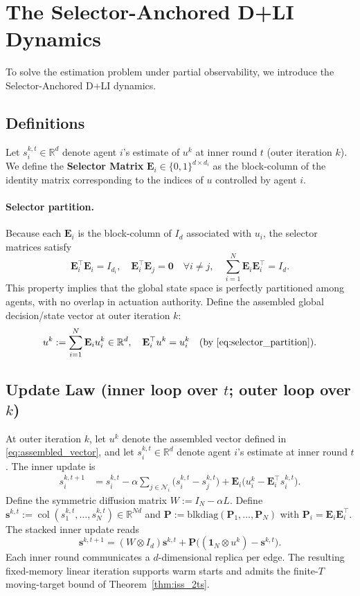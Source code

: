\documentclass[letterpaper, 10 pt, conference]{ieeeconf} %
\DeclareMathOperator{\col}{col}
\begin{document}
\section{The Selector-Anchored D+LI Dynamics}
\label{sec:Selector-Anchored}
To solve the estimation problem under partial observability, we introduce the Selector-Anchored D+LI dynamics. 
\subsection{Definitions}
Let $s_i^{k,t}\in\mathbb{R}^d$ denote agent $i$'s estimate of $u^k$ at inner round $t$ (outer iteration $k$). We define the \textbf{Selector Matrix} $\mathbf{E}_i \in \{0,1\}^{d \times d_i}$ as the block-column of the identity matrix corresponding to the indices of $u$ controlled by agent $i$.
\paragraph{Selector partition.}
Because each \(\mathbf E_i\) is the block-column of \(I_d\) associated with \(u_i\), the selector matrices satisfy
\begin{equation}\label{eq:selector_partition}
\mathbf{E}_i^\top \mathbf{E}_i = I_{d_i},
\quad
\mathbf{E}_i^\top \mathbf{E}_j = \mathbf{0}\quad \forall i\neq j,
\quad
\sum_{i=1}^N \mathbf{E}_i \mathbf{E}_i^\top = I_d.
\end{equation}
This property implies that the global state space is perfectly partitioned among agents, with no overlap in actuation authority. Define the assembled global decision/state vector at outer iteration $k$:
\begin{align}\label{eq:assembled_vector}
u^k
:=\sum_{i=1}^N\mathbf E_i u_i^k\in\mathbb R^d,
\quad \mathbf E_i^\top u^k
=u_i^k
\quad\text{(by \eqref{eq:selector_partition})}.
\end{align}
\subsection{Update Law (inner loop over $t$; outer loop over $k$)}
At outer iteration $k$, let $u^{k}$ denote the assembled vector defined in \eqref{eq:assembled_vector}, and let $s_i^{k,t}\in\mathbb{R}^d$ denote agent $i$'s estimate at inner round $t$. The inner update is
\begin{align}\label{eq:DLI_update_inner}
s_i^{k,t+1}
&=
s_i^{k,t}
-\alpha\sum_{j\in\mathcal N_i}\big(s_i^{k,t}-s_j^{k,t}\big)
+\mathbf{E}_i\Big(u_i^{k} - \mathbf{E}_i^\top s_i^{k,t}\Big).
\end{align}
Define the symmetric diffusion matrix $W:=I_N-\alpha L$. Define $\mathbf{s}^{k,t}:=\col(s_1^{k,t},\dots,s_N^{k,t})\in\mathbb{R}^{Nd}$ and $\mathbf{P}:=\mathrm{blkdiag}(\mathbf{P}_1,\dots,\mathbf{P}_N)$ with $\mathbf{P}_i=\mathbf{E}_i\mathbf{E}_i^\top$. The stacked inner update reads
\begin{equation}\label{eq:stacked_update_inner}
\mathbf{s}^{k,t+1}=(W\otimes I_d)\mathbf{s}^{k,t}
+\mathbf{P}\Big((\mathbf{1}_N\otimes u^{k})-\mathbf{s}^{k,t}\Big).
\end{equation}
Each inner round communicates a \(d\)-dimensional replica per edge. The resulting fixed-memory linear iteration supports warm starts and admits the finite-\(T\) moving-target bound of Theorem~\ref{thm:iss_2ts}.
\end{document}
